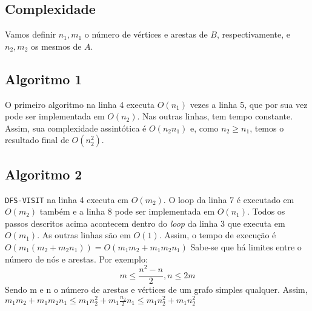 \documentclass[9pt]{article}
\newcommand{\tit}[1]{\textit{#1}}
\newcommand{\ttt}[1]{\texttt{#1}}
\begin{document}
\begin{multicols}{2}
\section{Complexidade}
Vamos definir $n_1, m_1$ o número de vértices e arestas de $B$, respectivamente,
e $n_2, m_2$ os mesmos de $A$.

\subsection{Algoritmo 1}
O primeiro algoritmo na linha 4 executa $O(n_1)$ vezes a linha 5, que por sua
vez pode ser implementada em $O(n_2)$. Nas outras linhas, tem tempo constante.
Assim, sua complexidade assintótica é $O(n_2n_1)$ e, como $n_2 \ge n_1$, temos
o resultado final de $O(n_{2}^2)$.

\subsection{Algoritmo 2}
\ttt{DFS-VISIT} na linha 4 executa em $O(m_2)$. O loop da linha 7 é executado 
em $O(m_2)$ também e a linha 8 pode ser implementada em $O(n_1)$. Todos os
passos descritos acima acontecem dentro do \tit{loop} da linha 3 que executa 
em $O(m_1)$. As outras linhas são em $O(1)$. Assim, o tempo de execução é
$O(m_1\left(m_2 + m_2n_1\right)) = O(m_1m_2 + m_1m_2n_1)$ Sabe-se que há
limites entre o número de nós e arestas. Por exemplo:
$$m \le \frac{n^2 - n}{2}, n \le 2m$$
Sendo m e n o número de arestas e vértices de um grafo simples qualquer.
Assim, $m_1m_2 + m_1m_2n_1 \le m_1n_{2}^2 + m_1\frac{n_2}{2}n_1 \le 
m_1n_{2}^2 + m_1n_{2}^2$

\end{multicols}
\end{document}
